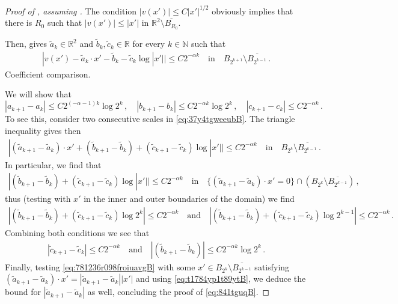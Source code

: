 \documentclass{article}
\newcommand{\N}{\mathbb{N}}
\newcommand{\R}{\mathbb{R}}
\theoremstyle{definition}
\begin{document}
\begin{proof}[Proof of , assuming ]
    The condition $|v(x')|\leq C|x'|^{1/2}$ obviously implies that there is $R_0$ such that $|v(x')|\leq |x'|$ in $\R^2\setminus \overline{B_{R_0}}$.
    
    Then,  gives $\widetilde a_{k}\in\R^2$ and $\widetilde b_{k},\widetilde c_{k}\in\R$ for every $k\in\N$ such that
\begin{align}\label{eq:37y4tgweeubB}
    |v(x')-\widetilde a_{k}\cdot x'-\widetilde b_k-\widetilde c_k\log |x'||\leq  C 2^{- \alpha k}\quad\mbox{in}\quad B_{2^{k+1}}\setminus \overline{B_{2^{k-1}}}\,.
\end{align}
 Coefficient comparison.

We will show that
\begin{equation}\label{eq:841tguqB}
    |a_{k+1}-a_k|\leq C 2^{(-\alpha-1)k}\log 2^k\,,\quad |b_{k+1}-b_k|\leq C 2^{- \alpha k}\log 2^k\,,\quad |c_{k+1}-c_k|\leq C 2^{- \alpha k}\,.
\end{equation}
To see this, consider two consecutive scales in \eqref{eq:37y4tgweeubB}. The triangle inequality gives then
\begin{align}\label{eq:781236r098froiuavgB}
    |(\widetilde a_{k+1}-\widetilde a_{k})\cdot x'+(\widetilde b_{k+1}-\widetilde b_k)+(\widetilde c_{k+1}-\widetilde c_k)\log |x'||\leq  C 2^{- \alpha k}\quad\mbox{in}\quad B_{2^{k}}\setminus \overline{B_{2^{k-1}}}\,.
\end{align}
In particular, we find that
\begin{align*}
    |(\widetilde b_{k+1}-\widetilde b_k)+(\widetilde c_{k+1}-\widetilde c_k)\log |x'||\leq  C 2^{- \alpha k}\quad\mbox{in}\quad \{(\widetilde a_{k+1}-\widetilde a_{k})\cdot x'=0\}\cap (B_{2^{k}}\setminus \overline{B_{2^{k-1}}}) \,,
\end{align*}
thus (testing with $x'$ in the inner and outer boundaries of the domain) we find
\begin{align*}
    |(\widetilde b_{k+1}-\widetilde b_k)+(\widetilde c_{k+1}-\widetilde c_k)\log 2^k|\leq  C 2^{- \alpha k} \quad\mbox{and}\quad |(\widetilde b_{k+1}-\widetilde b_k)+(\widetilde c_{k+1}-\widetilde c_k)\log 2^{k-1}|\leq  C 2^{- \alpha k}\,.
\end{align*}
Combining both conditions we see that
\begin{align}\label{eq:t1784yp1t89ytB}
    |\widetilde c_{k+1}-\widetilde c_k|\leq  C 2^{- \alpha k}\quad\mbox{and}\quad |(\widetilde b_{k+1}-\widetilde b_k)|\leq  C 2^{- \alpha k}\log 2^k\,.
\end{align}
Finally, testing \eqref{eq:781236r098froiuavgB} with some $x'\in B_{2^{k}}\setminus \overline{B_{2^{k-1}}}$ satisfying $(\widetilde a_{k+1}-\widetilde a_{k})\cdot x'=|\widetilde a_{k+1}-\widetilde a_{k}||x'|$ and using \eqref{eq:t1784yp1t89ytB}, we deduce the bound for $|\widetilde a_{k+1}-\widetilde a_{k}|$ as well, concluding the proof of \eqref{eq:841tguqB}.



\end{proof}
\end{document}
